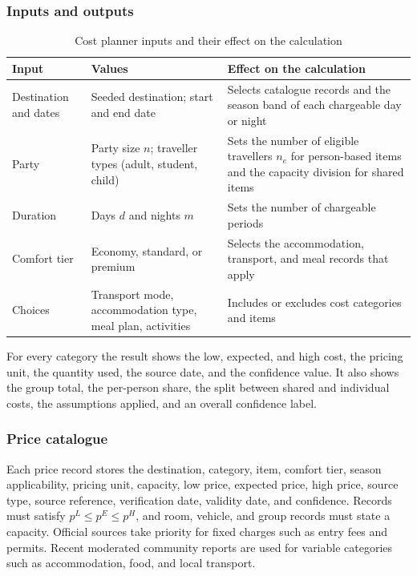 \documentclass[11pt,a4paper]{article}
\newcommand{\hd}[1]{\textbf{#1}}
\begin{document}
\subsubsection{Inputs and outputs}
\begin{table}[!htbp]
\centering
\caption{Cost planner inputs and their effect on the calculation}\label{tab:planner-inputs}
{\small
\begin{tabularx}{\textwidth}{L{38mm}L{46mm}Y}
\toprule
\hd{Input} & \hd{Values} & \hd{Effect on the calculation} \\
\midrule
Destination and dates & Seeded destination; start and end date & Selects catalogue records and the season band of each chargeable day or night \\
Party & Party size $n$; traveller types (adult, student, child) & Sets the number of eligible travellers $n_e$ for person-based items and the capacity division for shared items \\
Duration & Days $d$ and nights $m$ & Sets the number of chargeable periods \\
Comfort tier & Economy, standard, or premium & Selects the accommodation, transport, and meal records that apply \\
Choices & Transport mode, accommodation type, meal plan, activities & Includes or excludes cost categories and items \\
\bottomrule
\end{tabularx}
}
\end{table}

For every category the result shows the low, expected, and high cost, the pricing unit, the quantity used, the source date, and the confidence value. It also shows the group total, the per-person share, the split between shared and individual costs, the assumptions applied, and an overall confidence label.

\subsubsection{Price catalogue}
Each price record stores the destination, category, item, comfort tier, season applicability, pricing unit, capacity, low price, expected price, high price, source type, source reference, verification date, validity date, and confidence. Records must satisfy $p^{L} \le p^{E} \le p^{H}$, and room, vehicle, and group records must state a capacity. Official sources take priority for fixed charges such as entry fees and permits. Recent moderated community reports are used for variable categories such as accommodation, food, and local transport.
\end{document}

